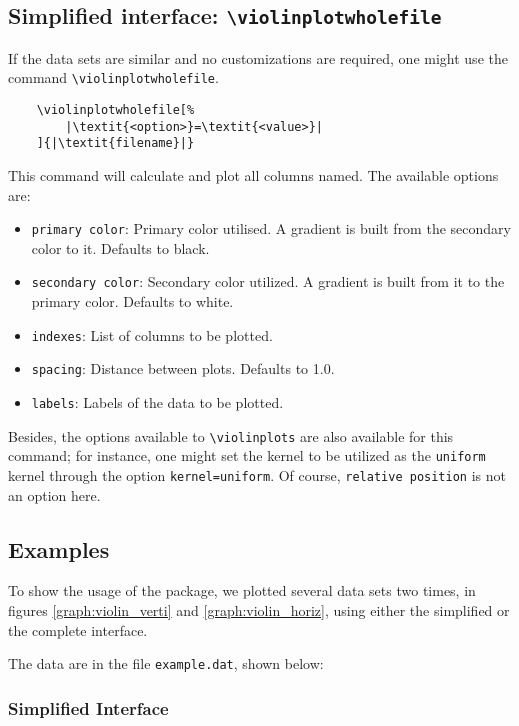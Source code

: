 \documentclass{article}
\begin{document}
\subsection{Simplified interface: \texttt{{\textbackslash}violinplotwholefile}}

If the data sets are similar and no customizations are required, one might
use the command \texttt{{\textbackslash}violinplotwholefile}.

\begin{verbatim}
	\violinplotwholefile[%
		|\textit{<option>}=\textit{<value>}|
	]{|\textit{filename}|}
\end{verbatim}

This command will calculate and plot all columns named. The available options
are:

\begin{itemize}
	\item \texttt{primary color}: Primary color utilised. A gradient is built from
		the secondary color to it. Defaults to black.
	\item \texttt{secondary color}: Secondary color utilized. A
		gradient is built from it to the primary color. Defaults
		to white.
	\item \texttt{indexes}: List of columns to be plotted.
	\item \texttt{spacing}: Distance between plots. Defaults to 1.0.
	\item \texttt{labels}: Labels of the data to be plotted.
\end{itemize}

Besides, the options available to \texttt{{\textbackslash}violinplots} are also
available for this command; for instance, one might set the kernel to
be utilized as the \texttt{uniform} kernel through the option
\texttt{kernel=uniform}. Of course, \texttt{relative position} is not an option
here.

\subsection{Examples}

To show the usage of the package, we plotted several data sets two times, in
figures \ref{graph:violin_verti} and \ref{graph:violin_horiz}, using either the
simplified or the complete interface.

The data are in the file \texttt{example.dat}, shown below:

\subsubsection{Simplified Interface}
\end{document}

